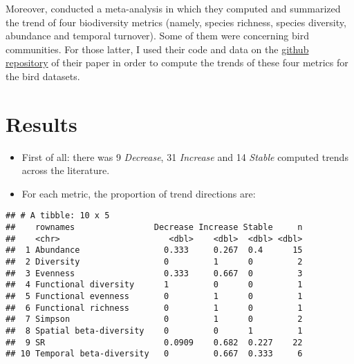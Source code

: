 \documentclass[
  12pt,
  oneside]{report}
\begin{document}
Moreover, \citet{pilotto_meta-analysis_2020} conducted a meta-analysis in which they computed and summarized the trend of four biodiversity metrics (namely, species richness, species diversity, abundance and temporal turnover). Some of them were concerning bird communities. For those latter, I used their code and data on the \href{https://github.com/FrsLry/R-code}{github repository} of their paper in order to compute the trends of these four metrics for the bird datasets.

\hypertarget{results}{%
\chapter{Results}\label{results}}

\begin{itemize}
\item
  First of all: there was 9 \emph{Decrease}, 31 \emph{Increase} and 14 \emph{Stable} computed trends across the literature.
\item
  For each metric, the proportion of trend directions are:
\end{itemize}

\begin{verbatim}
## # A tibble: 10 x 5
##    rownames                Decrease Increase Stable     n
##    <chr>                      <dbl>    <dbl>  <dbl> <dbl>
##  1 Abundance                 0.333     0.267  0.4      15
##  2 Diversity                 0         1      0         2
##  3 Evenness                  0.333     0.667  0         3
##  4 Functional diversity      1         0      0         1
##  5 Functional evenness       0         1      0         1
##  6 Functional richness       0         1      0         1
##  7 Simpson                   0         1      0         2
##  8 Spatial beta-diversity    0         0      1         1
##  9 SR                        0.0909    0.682  0.227    22
## 10 Temporal beta-diversity   0         0.667  0.333     6
\end{verbatim}
\end{document}
